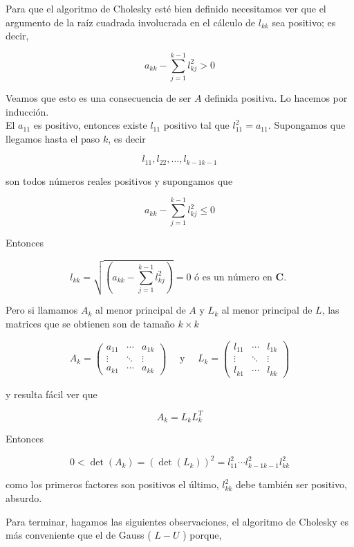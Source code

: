 \documentclass[10pt]{book}
\begin{document}
Para que el algoritmo de Cholesky esté bien definido necesitamos ver que el argumento de la raíz cuadrada involucrada en el cálculo de $l_{k k}$ sea positivo; es decir,

$$
a_{k k}-\sum_{j=1}^{k-1} l_{k j}^{2}>0
$$

Veamos que esto es una consecuencia de ser $A$ definida positiva. Lo hacemos por inducción.\\
El $a_{11}$ es positivo, entonces existe $l_{11}$ positivo tal que $l_{11}^{2}=a_{11}$. Supongamos que llegamos hasta el paso $k$, es decir

$$
l_{11}, l_{22}, \ldots, l_{k-1 k-1}
$$

son todos números reales positivos y supongamos que

$$
a_{k k}-\sum_{j=1}^{k-1} l_{k j}^{2} \leq 0
$$

Entonces

$$
l_{k k}=\sqrt{\left(a_{k k}-\sum_{j=1}^{k-1} l_{k j}^{2}\right)}=0 \text { ó es un número en } \boldsymbol{C} \text {. }
$$

Pero si llamamos $A_{k}$ al menor principal de $A$ y $L_{k}$ al menor principal de $L$, las matrices que se obtienen son de tamaño $k \times k$

$$
A_{k}=\left(\begin{array}{ccc}
a_{11} & \cdots & a_{1 k} \\
\vdots & \ddots & \vdots \\
a_{k 1} & \cdots & a_{k k}
\end{array}\right) \quad \text { y } \quad L_{k}=\left(\begin{array}{ccc}
l_{11} & \cdots & l_{1 k} \\
\vdots & \ddots & \vdots \\
l_{k 1} & \cdots & l_{k k}
\end{array}\right)
$$

y resulta fácil ver que

$$
A_{k}=L_{k} L_{k}^{T}
$$

Entonces

$$
0<\operatorname{det}\left(A_{k}\right)=\left(\operatorname{det}\left(L_{k}\right)\right)^{2}=l_{11}^{2} \cdots l_{k-1 k-1}^{2} l_{k k}^{2}
$$

como los primeros factores son positivos el último, $l_{k k}^{2}$ debe también ser positivo, absurdo.

Para terminar, hagamos las siguientes observaciones, el algoritmo de Cholesky es más conveniente que el de Gauss ( $L-U$ ) porque,
\end{document}
